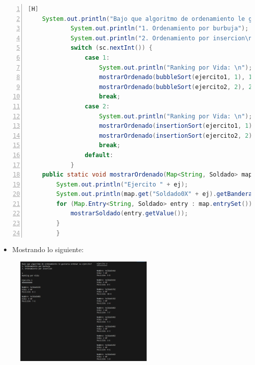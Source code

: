 \documentclass{article}
\begin{document}
	\begin{lstlisting}[language=java,caption={Mostrar mapa ya ordenado}, numbers=left][H]
	System.out.println("Bajo que algoritmo de ordenamiento le gustaria ordenar su ejercito?");
            System.out.println("1. Ordenamiento por burbuja");
            System.out.println("2. Ordenamiento por insercion\n");
            switch (sc.nextInt()) {
                case 1:
                    System.out.println("Ranking por Vida: \n");
                    mostrarOrdenado(bubbleSort(ejercito1, 1), 1);
                    mostrarOrdenado(bubbleSort(ejercito2, 2), 2);
                    break;
                case 2:
                    System.out.println("Ranking por Vida: \n");
                    mostrarOrdenado(insertionSort(ejercito1, 1), 1);
                    mostrarOrdenado(insertionSort(ejercito2, 2), 2);
                    break;
                default:
            }
	public static void mostrarOrdenado(Map<String, Soldado> map, int ej) {
        System.out.println("Ejercito " + ej);
        System.out.println(map.get("Soldado0X" + ej).getBandera() + "\n");
        for (Map.Entry<String, Soldado> entry : map.entrySet()) {
            mostrarSoldado(entry.getValue());
        }
    	}
	\end{lstlisting}
	
	\begin{itemize}	
		\item Mostrando lo siguiente:
	\end{itemize}
	
	\begin{figure}[H]
		\centering
	\includegraphics[width=0.6\textwidth,keepaspectratio]{img/captura4.png}
	\end{figure}
	
\end{document}
